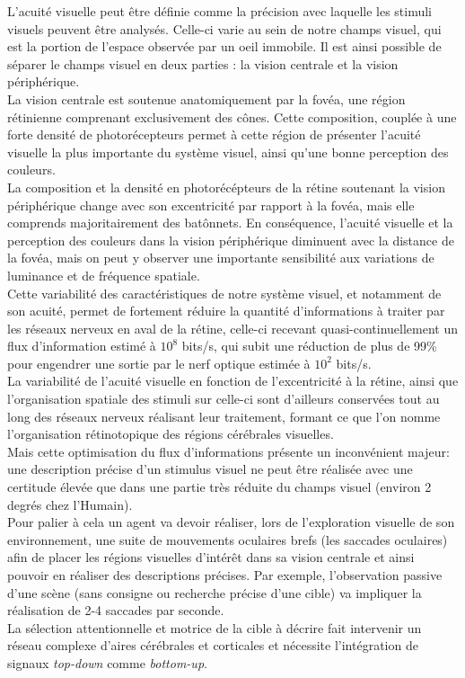 L'acuité visuelle peut être définie comme la précision avec laquelle les stimuli visuels peuvent être analysés. Celle-ci varie au sein de notre champs visuel, qui est la portion de l'espace observée par un oeil immobile. Il est ainsi possible de séparer le champs visuel en deux parties : la vision centrale et la vision périphérique.\autocite{Werner2014} \\
La vision centrale est soutenue anatomiquement par la fovéa, une région rétinienne comprenant exclusivement des cônes. Cette composition, couplée à une forte densité de photorécepteurs permet à cette région de présenter l'acuité visuelle la plus importante du système visuel, ainsi qu'une bonne perception des couleurs. \autocite{Werner2014} \\
La composition et la densité en photorécépteurs de la rétine soutenant la vision périphérique change avec son excentricité par rapport à la fovéa, mais elle comprends majoritairement des batônnets. En conséquence, l'acuité visuelle et la perception des couleurs dans la vision périphérique diminuent avec la distance de la fovéa, mais on peut y observer une importante sensibilité aux variations de luminance et de fréquence spatiale. \autocite{Werner2014} \\
Cette variabilité des caractéristiques de notre système visuel, et notamment de son acuité, permet de fortement réduire la quantité d'informations à traiter par les réseaux nerveux en aval de la rétine, celle-ci recevant quasi-continuellement un flux d'information estimé à $10^{8}$ bits/s, qui subit une réduction de plus de 99\% pour engendrer une sortie par le nerf optique estimée à $10^{2}$ bits/s. \autocite{Kortum1996, Werner2014, Zhaoping2014} \\
La variabilité de l'acuité visuelle en fonction de l'excentricité à la rétine, ainsi que l'organisation spatiale des stimuli sur celle-ci sont d'ailleurs conservées tout au long des réseaux nerveux réalisant leur traitement, formant ce que l'on nomme l'organisation rétinotopique des régions cérébrales visuelles. \autocite{Werner2014} \\

Mais cette optimisation du flux d'informations présente un inconvénient majeur: une description précise d'un stimulus visuel ne peut être réalisée avec une certitude élevée que dans une partie très réduite du champs visuel (environ 2 degrés chez l'Humain).\\
Pour palier à cela un agent va devoir réaliser, lors de l'exploration visuelle de son environnement, une suite de mouvements oculaires brefs (les saccades oculaires) afin de placer les régions visuelles d'intérêt dans sa vision centrale et ainsi pouvoir en réaliser des descriptions précises. Par exemple, l'observation passive d'une scène (sans consigne ou recherche précise d'une cible) va impliquer la réalisation de 2-4 saccades par seconde. \autocite{Krauzlis2017, Werner2014} \\
La sélection attentionnelle et motrice de la cible à décrire fait intervenir un réseau complexe d'aires cérébrales et corticales et nécessite l'intégration de signaux \textit{top-down} comme \textit{bottom-up}. \autocite{Werner2014} \\


